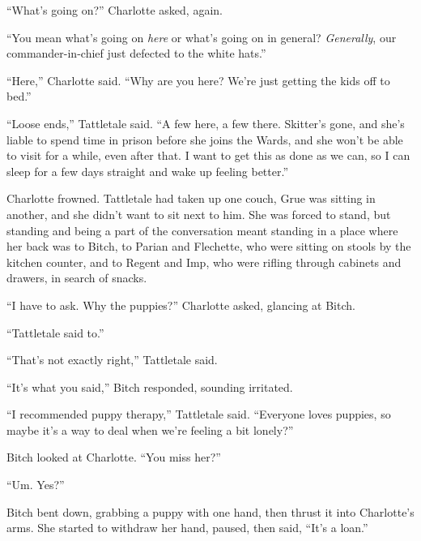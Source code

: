 ``What's going on?'' Charlotte asked, again.



``You mean what's going on \emph{here} or what's going on in general?  \emph{Generally}, our commander-in-chief just defected to the white hats.''



``Here,'' Charlotte said.  ``Why are you here?  We're just getting the kids off to bed.''



``Loose ends,'' Tattletale said.  ``A few here, a few there.  Skitter's gone, and she's liable to spend time in prison before she joins the Wards, and she won't be able to visit for a while, even after that.  I want to get this as done as we can, so I can sleep for a few days straight and wake up feeling better.''



Charlotte frowned.  Tattletale had taken up one couch, Grue was sitting in another, and she didn't want to sit next to him.  She was forced to stand, but standing and being a part of the conversation meant standing in a place where her back was to Bitch, to Parian and Flechette, who were sitting on stools by the kitchen counter, and to Regent and Imp, who were rifling through cabinets and drawers, in search of snacks.



``I have to ask.  Why the puppies?'' Charlotte asked, glancing at Bitch.



``Tattletale said to.''



``That's not exactly right,'' Tattletale said.



``It's what you said,'' Bitch responded, sounding irritated.



``I recommended puppy therapy,'' Tattletale said.  ``Everyone loves puppies, so maybe it's a way to deal when we're feeling a bit lonely?''



Bitch looked at Charlotte.  ``You miss her?''



``Um.  Yes?''



Bitch bent down, grabbing a puppy with one hand, then thrust it into Charlotte's arms.  She started to withdraw her hand, paused, then said, ``It's a loan.''



